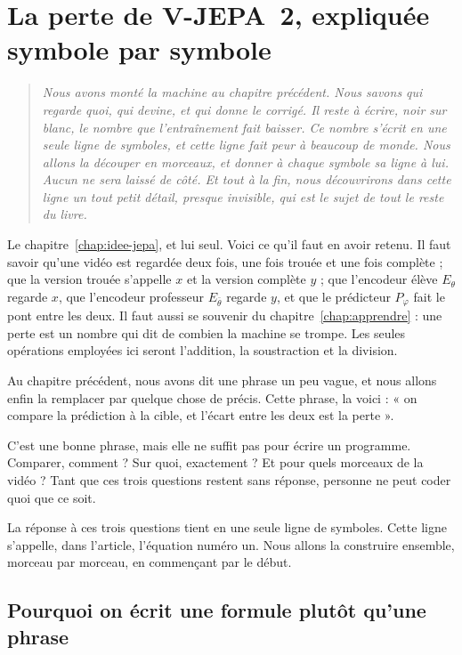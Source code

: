 \chapter{La perte de V-JEPA~2, expliquée symbole par symbole}
\label{chap:perte-vjepa2}

\begin{quote}\itshape
Nous avons monté la machine au chapitre précédent. Nous savons qui regarde
quoi, qui devine, et qui donne le corrigé. Il reste à écrire, noir sur
blanc, le nombre que l'entraînement fait baisser. Ce nombre s'écrit en une
seule ligne de symboles, et cette ligne fait peur à beaucoup de monde. Nous
allons la découper en morceaux, et donner à chaque symbole sa ligne à lui.
Aucun ne sera laissé de côté. Et tout à la fin, nous découvrirons dans cette
ligne un tout petit détail, presque invisible, qui est le sujet de tout le
reste du livre.
\end{quote}

\begin{prerequis}
Le chapitre~\ref{chap:idee-jepa}, et lui seul. Voici ce qu'il faut en avoir
retenu. Il faut savoir qu'une vidéo est regardée deux fois, une
fois trouée et une fois complète ; que la version trouée s'appelle $x$ et la
version complète $y$ ; que l'encodeur élève $E_{\theta}$ regarde $x$, que
l'encodeur professeur $E_{\bar{\theta}}$ regarde $y$, et que le prédicteur
$P_{\varphi}$ fait le pont entre les deux. Il faut aussi se souvenir du
chapitre~\ref{chap:apprendre} : une perte est un nombre qui dit de combien
la machine se trompe. Les seules opérations employées ici seront
l'addition, la soustraction et la division.
\end{prerequis}

Au chapitre précédent, nous avons dit une phrase un peu vague, et nous
allons enfin la remplacer par quelque chose de précis. Cette phrase, la
voici : « on compare la prédiction à la cible, et l'écart entre les deux est
la perte ».

C'est une bonne phrase, mais elle ne suffit pas pour écrire un programme. Comparer,
comment ? Sur quoi, exactement ? Et pour quels morceaux de la vidéo ? Tant
que ces trois questions restent sans réponse, personne ne peut coder quoi
que ce soit.

La réponse à ces trois questions tient en une seule ligne de symboles. Cette
ligne s'appelle, dans l'article, l'équation numéro un. Nous allons la
construire ensemble, morceau par morceau, en commençant par le début.

\section{Pourquoi on écrit une formule plutôt qu'une phrase}

